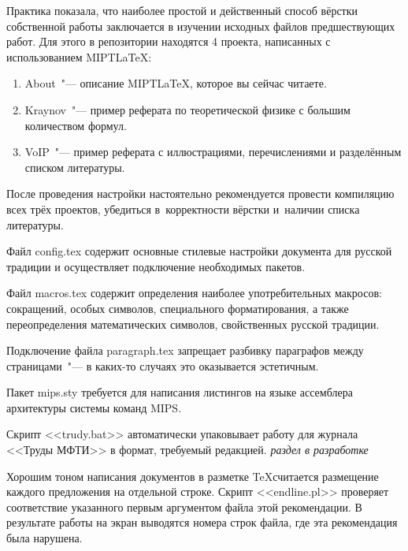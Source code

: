 
Практика показала, что наиболее простой и действенный способ вёрстки собственной работы заключается в изучении исходных файлов предшествующих работ.
Для этого в репозитории находятся 4 проекта, написанных с использованием MIPT\LaTeX:
\begin{enumerate}
    \item{About~"--- описание MIPT\LaTeX, которое вы сейчас читаете.}
    \item{Kraynov~"--- пример реферата по теоретической физике с большим количеством формул.}
    \item{VoIP~"--- пример реферата с иллюстрациями, перечислениями и разделённым списком литературы.}
\end{enumerate}

После проведения настройки настоятельно рекомендуется провести компиляцию всех трёх проектов, убедиться в~корректности вёрстки и~наличии списка литературы.



Файл config.tex содержит основные стилевые настройки документа для русской традиции и осуществляет подключение необходимых пакетов.


Файл macros.tex содержит определения наиболее употребительных макросов: сокращений, особых символов, специального форматирования, а также переопределения математических символов, свойственных русской традиции.


Подключение файла paragraph.tex запрещает разбивку параграфов между страницами~"--- в каких-то случаях это оказывается эстетичным.



Пакет mips.sty требуется для написания листингов на языке ассемблера архитектуры системы команд MIPS.



Скрипт <<trudy.bat>> автоматически упаковывает работу для журнала <<Труды МФТИ>> в формат, требуемый редакцией.
\emph{раздел в разработке}


Хорошим тоном написания документов в разметке \TeX считается размещение каждого предложения на отдельной строке.
Скрипт <<endline.pl>> проверяет соответствие указанного первым аргументом файла этой рекомендации.
В результате работы на экран выводятся номера строк файла, где эта рекомендация была нарушена.

